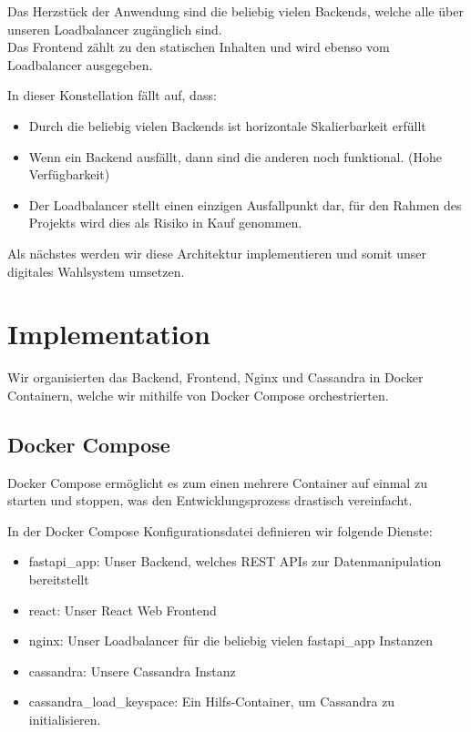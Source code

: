 \documentclass{article}  %
\begin{document}
Das Herzstück der Anwendung sind die beliebig vielen Backends, welche alle über unseren Loadbalancer zugänglich sind. \\
Das Frontend zählt zu den statischen Inhalten und wird ebenso vom Loadbalancer ausgegeben.

In dieser Konstellation fällt auf, dass: \\
\begin{itemize}
    \item Durch die beliebig vielen Backends ist horizontale Skalierbarkeit erfüllt
    \item Wenn ein Backend ausfällt, dann sind die anderen noch funktional. (Hohe Verfügbarkeit)
    \item Der Loadbalancer stellt einen einzigen Ausfallpunkt dar, für den Rahmen des Projekts wird dies als Risiko in Kauf genommen.
\end{itemize}

Als nächstes werden wir diese Architektur implementieren und somit unser digitales Wahlsystem umsetzen.



\newpage
\section{Implementation}
Wir organisierten das Backend, Frontend, Nginx und Cassandra in Docker Containern, welche wir mithilfe von Docker Compose orchestrierten.

\subsection{Docker Compose}
Docker Compose ermöglicht es zum einen mehrere Container auf einmal zu starten und stoppen, was den Entwicklungsprozess drastisch vereinfacht.

In der Docker Compose Konfigurationsdatei definieren wir folgende Dienste:
\begin{itemize}
    \item fastapi{\_}app: Unser Backend, welches REST APIs zur Datenmanipulation bereitstellt
    \item react: Unser React Web Frontend
    \item nginx: Unser Loadbalancer für die beliebig vielen fastapi{\_}app Instanzen
    \item cassandra: Unsere Cassandra Instanz
    \item cassandra{\_}load{\_}keyspace: Ein Hilfs-Container, um Cassandra zu initialisieren.
\end{itemize}
\end{document}
